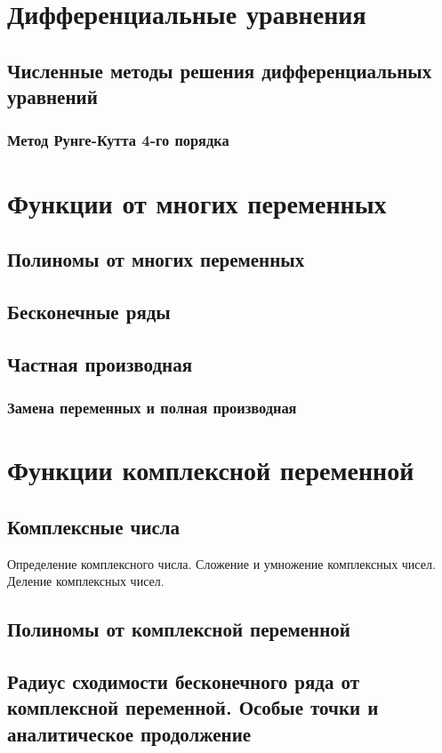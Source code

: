\documentclass{article}
\begin{document}
\section{Дифференциальные уравнения}
\subsection{Численные методы решения дифференциальных уравнений}
\subsubsection{Метод Рунге-Кутта 4-го порядка}
\section{Функции от многих переменных}
\subsection{Полиномы от многих переменных}
\subsection{Бесконечные ряды}
\subsection{Частная производная}
\subsubsection{Замена переменных и полная производная}
\section{Функции комплексной переменной}
\subsection{Комплексные числа}
Определение комплексного числа. Сложение и умножение комплексных чисел. Деление комплексных чисел.
\subsection{Полиномы от комплексной переменной}
\subsection{Радиус сходимости бесконечного ряда от комплексной переменной. Особые точки и аналитическое продолжение}
\end{document}
